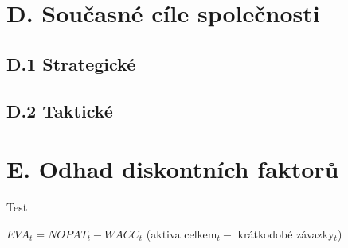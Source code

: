 \newpage



\section*{D. Současné cíle společnosti}

\subsection*{D.1 Strategické}

\subsection*{D.2 Taktické}

\section*{E. Odhad diskontních faktorů}

Test 

$EVA_t = NOPAT_t - WACC_t$ (aktiva celkem$_t -$ krátkodobé závazky$_t$)

